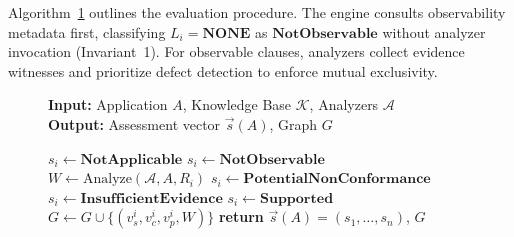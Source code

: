 Algorithm~\ref{alg:assessment} outlines the evaluation procedure. The engine consults observability metadata first, classifying $L_i = \mathbf{NONE}$ as $\mathbf{NotObservable}$ without analyzer invocation (Invariant~1). For observable clauses, analyzers collect evidence witnesses and prioritize defect detection to enforce mutual exclusivity.

\begin{figure}[t]
\begin{tcolorbox}[colback=gray!5!white,colframe=black!75,title={\textbf{Algorithm 1}: Epistemic Assessment Procedure},fontupper=\scriptsize]
\textbf{Input:} Application $A$, Knowledge Base $\mathcal{K}$, Analyzers $\mathcal{A}$\\
\textbf{Output:} Assessment vector $\vec{s}(A)$, Graph $G$
\begin{algorithmic}
    \STATE $s_i \leftarrow \mathbf{NotApplicable}$
    \STATE $s_i \leftarrow \mathbf{NotObservable}$
  \ELSE
    \STATE $W \leftarrow \text{Analyze}(\mathcal{A}, A, R_i)$ 
      \STATE $s_i \leftarrow \mathbf{PotentialNonConformance}$
      \STATE $s_i \leftarrow \mathbf{InsufficientEvidence}$
    \ELSE
      \STATE $s_i \leftarrow \mathbf{Supported}$
    \ENDIF
    \STATE $G \leftarrow G \cup \{(v_s^i, v_c^i, v_p^i, W)\}$
  \ENDIF
\ENDFOR
\STATE \textbf{return} $\vec{s}(A) = (s_1, \ldots, s_n)$, $G$
\end{algorithmic}
\end{tcolorbox}
\label{alg:assessment}
\end{figure}
